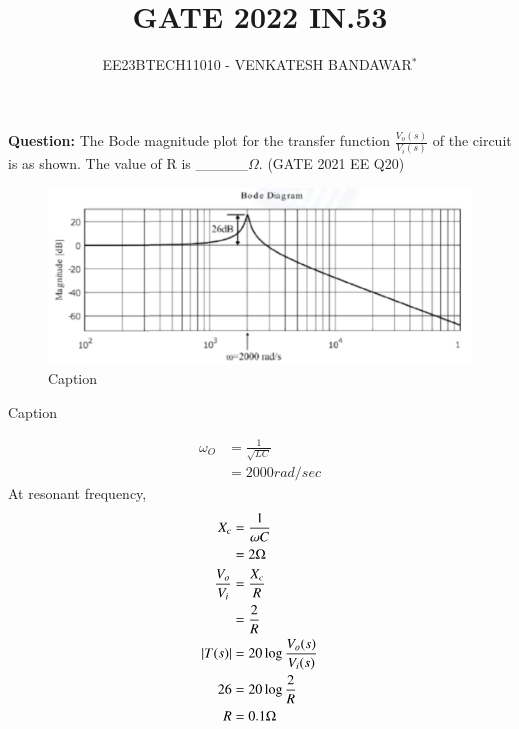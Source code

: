 \documentclass[journal,12pt,twocolumn]{IEEEtran}
\theoremstyle{remark}
\begin{document}

\vspace{3cm}

\title{GATE 2022 IN.53}
\author{EE23BTECH11010 - VENKATESH BANDAWAR$^{*}$%
}
\maketitle
\newpage
\bigskip
\textbf{Question:} The Bode magnitude plot for the transfer function $\frac{V_o(s)}{V_i(s)}$ of the circuit is as shown. The value of R is \_\_\_\_\_$\Omega$. \hfill(GATE 2021 EE Q20)
\begin{figure}[!ht]
    \centering
    
\end{figure}
\begin{figure}[!ht]
    \centering
    \includegraphics[width=\columnwidth]{figs/bode.png}
    \caption{Caption}
    \label{fig:enter-label}
\end{figure}
\solution
\begin{table}[!ht]
    \centering
    
    \caption{Caption}
    \label{tab:my_label}
\end{table}
\begin{align}
    \omega_O &= \frac{1}{\sqrt{LC}}\\
    &= 2000rad/sec
\end{align}
At resonant frequency, 
\begin{align}
    X_c &= \frac{1}{\omega C}\\
    &= 2 \Omega\\
     \frac{V_o}{V_i} &= \frac{X_c}{R} \\
     &= \frac{2}{R}\\
     \left\vert T(s)\right\vert &= 20 \log\frac{V_o(s)}{V_i(s)}\\
     26 &= 20 \log\frac{2}{R}\\
     R &= 0.1 \Omega
\end{align}
\end{document}
